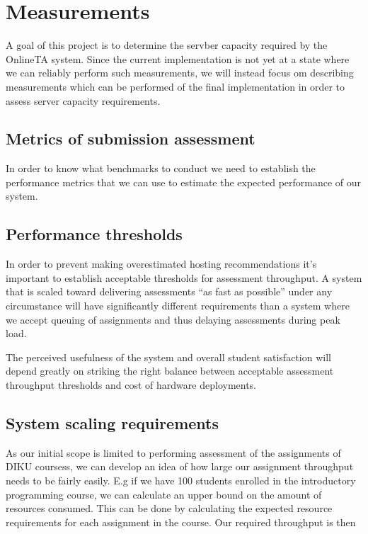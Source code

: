 \chapter{Measurements}
A goal of this project is to determine the servber capacity required by
the OnlineTA system. Since the current implementation is not yet at a
state where we can reliably perform such measurements, we will instead
focus om describing measurements which can be performed of the final
implementation in order to assess server capacity requirements.


\section{Metrics of submission assessment}
In order to know what benchmarks to conduct we need to establish the
performance metrics that we can use to estimate the expected
performance of our system.



\section{Performance thresholds}
In order to prevent making overestimated hosting recommendations it's
important to establish acceptable thresholds for assessment
throughput. A system that is scaled toward delivering assessments "`as
fast as possible"' under any circumstance will have significantly
different requirements than a system where we accept queuing of
assignments and thus delaying assessments during peak load.

The perceived usefulness of the system and overall student
satisfaction will depend greatly on striking the right balance between
acceptable assessment throughput thresholds and cost of hardware
deployments.

\section{System scaling requirements}
As our initial scope is limited to performing assessment of
the assignments of DIKU coursess, we can develop an
idea of how large our assignment throughput needs to be fairly easily. E.g if we
have 100 students enrolled in the introductory programming course, we
can calculate an upper bound on the amount of resources
consumed. This can be done by calculating the expected resource
requirements for each assignment in the course. Our required
throughput is then 

